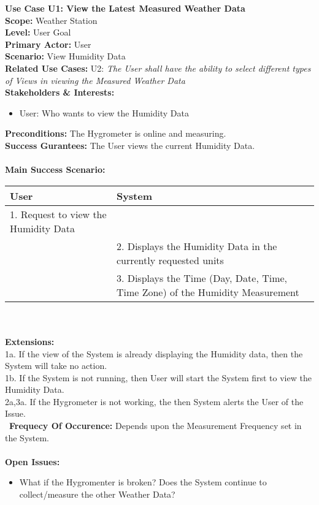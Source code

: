 \documentclass[letterpaper]{article}
\begin{document}
\noindent
\textbf{Use Case U1:  View the Latest Measured Weather Data}\\
\textbf{Scope:  }Weather Station\\
\textbf{Level:  }User Goal\\
\textbf{Primary Actor:  }User\\
\textbf{Scenario:  }View Humidity Data\\
\textbf{Related Use Cases:  }U2: \textit{The User shall have the
ability to select different types of Views in viewing the Measured
Weather Data}\\
\textbf{Stakeholders \& Interests:  }
\begin{itemize}
\item User:  Who wants to view the Humidity Data
\end{itemize}
\textbf{Preconditions:  }The Hygrometer is online and measuring.\\
\textbf{Success Gurantees:  }The User views the current Humidity
Data.\\\\
\textbf{Main Success Scenario:  }\\
\begin{tabular}{|p{6cm}|p{6cm}|}\hline
\textbf{User} & \textbf{System}\\\hline
1.  Request to view the Humidity Data & \\\hline
& 2.  Displays the Humidity Data in the currently requested
units\\\hline
& 3.  Displays the Time (Day, Date, Time, Time Zone) of the
Humidity Measurement\\\hline
\end{tabular}\\\\
\textbf{Extensions:  }\\
1a.  If the view of the System is already displaying the Humidity
data, then the System will take no action.\\
1b.  If the System is not running, then User will start the System
first to view the Humidity Data.\\
2a,3a.  If the Hygrometer is not working, the then System
alerts the User of the Issue.\\\
\textbf{Frequecy Of Occurence: } Depends upon the Measurement
Frequency set in the System.\\\\
\textbf{Open Issues: }
\begin{itemize}
\item What if the Hygromenter is broken?  Does the System continue
to collect/measure the other Weather Data?
\end{itemize}
\end{document}
